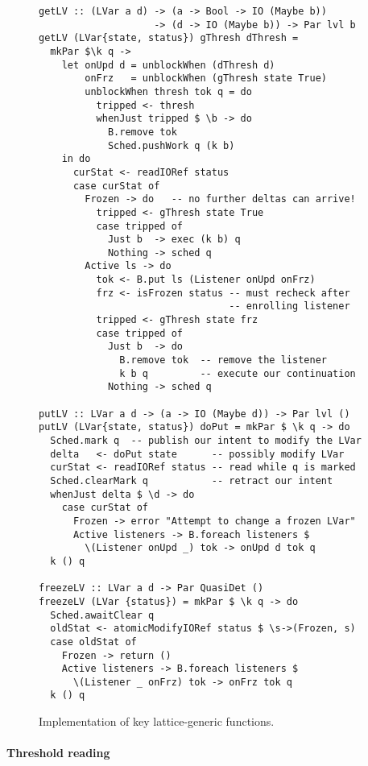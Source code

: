 \begin{figure}
\lstset{basicstyle=\footnotesize\ttfamily}
\begin{lstlisting}
getLV :: (LVar a d) -> (a -> Bool -> IO (Maybe b)) 
                    -> (d -> IO (Maybe b)) -> Par lvl b
getLV (LVar{state, status}) gThresh dThresh = 
  mkPar $\k q -> 
    let onUpd d = unblockWhen (dThresh d)
        onFrz   = unblockWhen (gThresh state True)
        unblockWhen thresh tok q = do
          tripped <- thresh
          whenJust tripped $ \b -> do
            B.remove tok
            Sched.pushWork q (k b)                     
    in do
      curStat <- readIORef status
      case curStat of
        Frozen -> do   -- no further deltas can arrive!
          tripped <- gThresh state True
          case tripped of
            Just b  -> exec (k b) q
            Nothing -> sched q     
        Active ls -> do
          tok <- B.put ls (Listener onUpd onFrz)
          frz <- isFrozen status -- must recheck after
                                 -- enrolling listener
          tripped <- gThresh state frz
          case tripped of
            Just b  -> do
              B.remove tok  -- remove the listener 
              k b q         -- execute our continuation
            Nothing -> sched q

putLV :: LVar a d -> (a -> IO (Maybe d)) -> Par lvl ()
putLV (LVar{state, status}) doPut = mkPar $ \k q -> do  
  Sched.mark q  -- publish our intent to modify the LVar
  delta   <- doPut state      -- possibly modify LVar
  curStat <- readIORef status -- read while q is marked
  Sched.clearMark q           -- retract our intent
  whenJust delta $ \d -> do
    case curStat of
      Frozen -> error "Attempt to change a frozen LVar"
      Active listeners -> B.foreach listeners $ 
        \(Listener onUpd _) tok -> onUpd d tok q
  k () q 

freezeLV :: LVar a d -> Par QuasiDet ()
freezeLV (LVar {status}) = mkPar $ \k q -> do
  Sched.awaitClear q
  oldStat <- atomicModifyIORef status $ \s->(Frozen, s)    
  case oldStat of
    Frozen -> return ()
    Active listeners -> B.foreach listeners $ 
      \(Listener _ onFrz) tok -> onFrz tok q
  k () q
\end{lstlisting}
\caption{Implementation of key lattice-generic functions.}\label{fig:implementation}
\end{figure}

\paragraph{Threshold reading}

